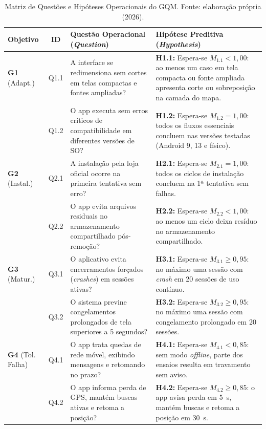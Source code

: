 \documentclass[11pt,a4paper]{article}
\begin{document}
\begin{table}[!htbp]
\centering
\caption{Matriz de Questões e Hipóteses Operacionais do GQM. Fonte: elaboração própria (2026).}
\label{tab:questoes_hipoteses}
\scriptsize
\renewcommand{\arraystretch}{0.92}
\begin{tabularx}{\textwidth}{l c X X}
\toprule
\textbf{Objetivo} & \textbf{ID} & \textbf{Questão Operacional (\textit{Question})} & \textbf{Hipótese Preditiva (\textit{Hypothesis})} \\
\midrule
\textbf{G1} (Adapt.) & Q1.1 & A interface se redimensiona sem cortes em telas compactas e fontes ampliadas? & \textbf{H1.1:} Espera-se $M_{1.1} < 1{,}00$: ao menos um caso em tela compacta ou fonte ampliada apresenta corte ou sobreposição na camada do mapa. \\
& Q1.2 & O app executa sem erros críticos de compatibilidade em diferentes versões de SO? & \textbf{H1.2:} Espera-se $M_{1.2} = 1{,}00$: todos os fluxos essenciais concluem nas versões testadas (Android 9, 13 e físico). \\
\midrule
\textbf{G2} (Instal.) & Q2.1 & A instalação pela loja oficial ocorre na primeira tentativa sem erro? & \textbf{H2.1:} Espera-se $M_{2.1} = 1{,}00$: todos os ciclos de instalação concluem na 1ª tentativa sem falhas. \\
& Q2.2 & O app evita arquivos residuais no armazenamento compartilhado pós-remoção? & \textbf{H2.2:} Espera-se $M_{2.2} < 1{,}00$: ao menos um ciclo deixa resíduo no armazenamento compartilhado. \\
\midrule
\textbf{G3} (Matur.) & Q3.1 & O aplicativo evita encerramentos forçados (\textit{crashes}) em sessões ativas? & \textbf{H3.1:} Espera-se $M_{3.1} \ge 0{,}95$: no máximo uma sessão com \textit{crash} em 20 sessões de uso contínuo. \\
& Q3.2 & O sistema previne congelamentos prolongados de tela superiores a 5 segundos? & \textbf{H3.2:} Espera-se $M_{3.2} \ge 0{,}95$: no máximo uma sessão com congelamento prolongado em 20 sessões. \\
\midrule
\textbf{G4} (Tol. Falha) & Q4.1 & O app trata quedas de rede móvel, exibindo mensagens e retomando no prazo? & \textbf{H4.1:} Espera-se $M_{4.1} < 0{,}85$: sem modo \textit{offline}, parte dos ensaios resulta em travamento sem aviso. \\
& Q4.2 & O app informa perda de GPS, mantém buscas ativas e retoma a posição? & \textbf{H4.2:} Espera-se $M_{4.2} \ge 0{,}85$: o app avisa perda em 5~s, mantém buscas e retoma a posição em 30~s. \\

\end{tabularx}
\end{table}
\end{document}
